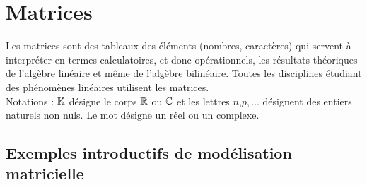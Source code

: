 \documentclass{book}
\begin{document}
\chapter*{Matrices}
\begin{Texte}
Les matrices sont des tableaux des éléments (nombres, caractères) qui servent à interpréter en termes calculatoires, et donc opérationnels, les résultats théoriques de l'algèbre linéaire et même de l'algèbre bilinéaire. Toutes les disciplines étudiant des phénomènes linéaires utilisent les matrices.\\ 
Notations : $\mathbb{K} $ désigne le corps $\mathbb{R}$ ou $\mathbb{C}$ et les lettres $n$,$p,\dots$ désignent des entiers naturels non nuls. Le mot  désigne un réel ou un complexe. 
\end{Texte}
\section{Exemples introductifs de modélisation matricielle}
\end{document}
